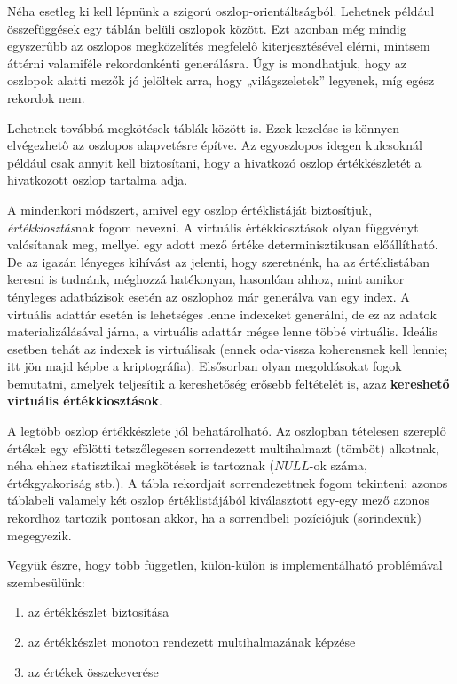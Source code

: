 \documentclass[
    parspace,
    noindent,
    nohyp,
]{elteiktdk}[2023/04/10]
\begin{document}
Néha esetleg ki kell lépnünk a szigorú oszlop-orientáltságból.
Lehetnek például összefüggések egy táblán belüli oszlopok között.
Ezt azonban még mindig egyszerűbb az oszlopos megközelítés megfelelő kiterjesztésével elérni,
mintsem áttérni valamiféle rekordonkénti generálásra.
Úgy is mondhatjuk, hogy az oszlopok alatti mezők jó jelöltek arra, hogy „világszeletek” legyenek,
míg egész rekordok nem.

Lehetnek továbbá megkötések táblák között is.
Ezek kezelése is könnyen elvégezhető az oszlopos alapvetésre építve.
Az egyoszlopos idegen kulcsoknál például csak annyit kell biztosítani,
hogy a hivatkozó oszlop értékkészletét a hivatkozott oszlop tartalma adja.

A mindenkori módszert, amivel egy oszlop értéklistáját biztosítjuk,
\textit{értékkiosztás}nak fogom nevezni.
A virtuális értékkiosztások olyan függvényt valósítanak meg,
mellyel egy adott mező értéke determinisztikusan előállítható.
De az igazán lényeges kihívást az jelenti, hogy szeretnénk,
ha az értéklistában keresni is tudnánk, méghozzá hatékonyan,
hasonlóan ahhoz, mint amikor tényleges adatbázisok esetén
az oszlophoz már generálva van egy index.
A virtuális adattár esetén is lehetséges lenne indexeket generálni,
de ez az adatok materializálásával járna,
a virtuális adattár mégse lenne többé virtuális.
Ideális esetben tehát az indexek is virtuálisak
(ennek oda-vissza koherensnek kell lennie; itt jön majd képbe a kriptográfia).
Elsősorban olyan megoldásokat fogok bemutatni,
amelyek teljesítik a kereshetőség erősebb feltételét is,
azaz \textbf{kereshető virtuális értékkiosztások}.

A legtöbb oszlop értékkészlete jól behatárolható.
Az oszlopban tételesen szereplő értékek egy efölötti
tetszőlegesen sorrendezett multihalmazt (tömböt) alkotnak,
néha ehhez statisztikai megkötések is tartoznak ($NULL$-ok száma, értékgyakoriság stb.).
A tábla rekordjait sorrendezettnek fogom tekinteni:
azonos táblabeli valamely két oszlop értéklistájából kiválasztott egy-egy mező
azonos rekordhoz tartozik pontosan akkor, ha a sorrendbeli pozíciójuk (sorindexük) megegyezik.

Vegyük észre, hogy több független, külön-külön is implementálható problémával szembesülünk:

\begin{enumerate}
    \item az értékkészlet biztosítása
    \item az értékkészlet monoton rendezett multihalmazának képzése
    \item az értékek összekeverése
\end{enumerate}
\end{document}
